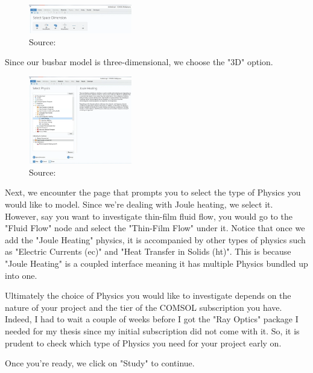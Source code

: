 \begin{figure}[ht!]
  \centering
  \includegraphics[width=0.4\textwidth]{Chapters/Figures/Chapter 3 Figures/Select Space Dimension.png}
  \caption{ Source: \cite{}}
  \label{}
\end{figure}

Since our busbar model is three-dimensional, we choose the "3D" option.

\begin{figure}[ht!]
  \centering
  \includegraphics[width=0.4\textwidth]{Chapters/Figures/Chapter 3 Figures/Select Physics.png}
  \caption{ Source: \cite{}}
  \label{}
\end{figure}

Next, we encounter the page that prompts you to select the type of Physics you would like to model. Since we're dealing with Joule heating, we select it. However, say you want to investigate thin-film fluid flow, you would go to the "Fluid Flow" node and select the "Thin-Film Flow" under it. Notice that once we add the "Joule Heating" physics, it is accompanied by other types of physics such as "Electric Currents (ec)" and "Heat Transfer in Solids (ht)". This is because "Joule Heating" is a coupled interface meaning it has multiple Physics bundled up into one.

Ultimately the choice of Physics you would like to investigate depends on the nature of your project and the tier of the COMSOL subscription you have. Indeed, I had to wait a couple of weeks before I got the "Ray Optics" package I needed for my thesis since my initial subscription did not come with it. So, it is prudent to check which type of Physics you need for your project early on.

Once you're ready, we click on "Study" to continue.

